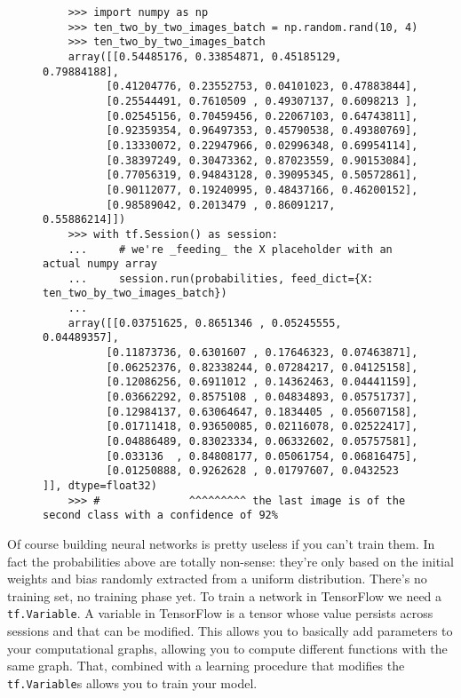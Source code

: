 \begin{figure}
  \begin{verbatim}
    >>> import numpy as np
    >>> ten_two_by_two_images_batch = np.random.rand(10, 4)
    >>> ten_two_by_two_images_batch
    array([[0.54485176, 0.33854871, 0.45185129, 0.79884188],
          [0.41204776, 0.23552753, 0.04101023, 0.47883844],
          [0.25544491, 0.7610509 , 0.49307137, 0.6098213 ],
          [0.02545156, 0.70459456, 0.22067103, 0.64743811],
          [0.92359354, 0.96497353, 0.45790538, 0.49380769],
          [0.13330072, 0.22947966, 0.02996348, 0.69954114],
          [0.38397249, 0.30473362, 0.87023559, 0.90153084],
          [0.77056319, 0.94843128, 0.39095345, 0.50572861],
          [0.90112077, 0.19240995, 0.48437166, 0.46200152],
          [0.98589042, 0.2013479 , 0.86091217, 0.55886214]])
    >>> with tf.Session() as session:
    ...     # we're _feeding_ the X placeholder with an actual numpy array
    ...     session.run(probabilities, feed_dict={X: ten_two_by_two_images_batch})
    ...
    array([[0.03751625, 0.8651346 , 0.05245555, 0.04489357],
          [0.11873736, 0.6301607 , 0.17646323, 0.07463871],
          [0.06252376, 0.82338244, 0.07284217, 0.04125158],
          [0.12086256, 0.6911012 , 0.14362463, 0.04441159],
          [0.03662292, 0.8575108 , 0.04834893, 0.05751737],
          [0.12984137, 0.63064647, 0.1834405 , 0.05607158],
          [0.01711418, 0.93650085, 0.02116078, 0.02522417],
          [0.04886489, 0.83023334, 0.06332602, 0.05757581],
          [0.033136  , 0.84808177, 0.05061754, 0.06816475],
          [0.01250888, 0.9262628 , 0.01797607, 0.0432523 ]], dtype=float32)
    >>> #              ^^^^^^^^^ the last image is of the second class with a confidence of 92%
  \end{verbatim}
  \caption{}
\end{figure}

Of course building neural networks is pretty useless if you can't train
them. In fact the probabilities above are totally non-sense: they're
only based on the initial weights and bias randomly extracted from a
uniform distribution. There's no training set, no training phase yet. To
train a network in TensorFlow we need a \texttt{tf.Variable}. A
variable in TensorFlow is a tensor whose value persists across sessions
and that can be modified. This allows you to basically add parameters
to your computational graphs, allowing you to compute different
functions with the same graph. That, combined with a learning procedure
that modifies the \texttt{tf.Variable}s allows you to train your model.

